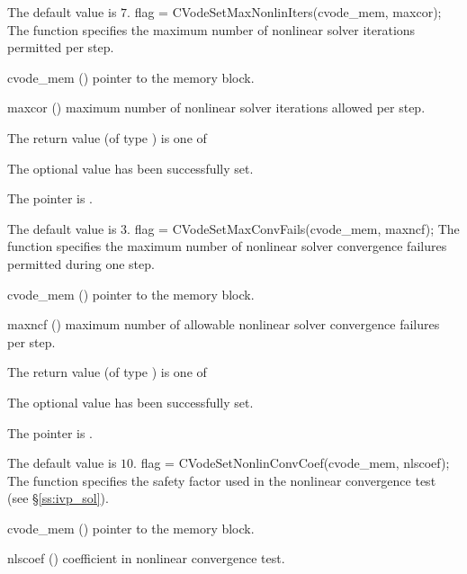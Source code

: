 {
  The default value is $7$.
}
{
flag = CVodeSetMaxNonlinIters(cvode\_mem, maxcor);
}
{
  The function  specifies the maximum
  number of nonlinear solver iterations permitted per step.
}
{
  \begin{args}
  \item[cvode\_mem] ()
    pointer to the {\cvodes} memory block.
  \item[maxcor] ()
    maximum number of nonlinear solver iterations allowed per step.
  \end{args}
}
{
  The return value  (of type ) is one of
  \begin{args}
  \item[\Id{CV\_SUCCESS}] 
    The optional value has been successfully set.
  \item[\Id{CV\_MEM\_NULL}]
    The  pointer is .
  \end{args}
}
{
  The default value is $3$.
}
{
flag = CVodeSetMaxConvFails(cvode\_mem, maxncf);
}
{
  The function  specifies the
  maximum number of nonlinear solver convergence failures permitted during
  one step.
}
{
  \begin{args}
  \item[cvode\_mem] ()
    pointer to the {\cvodes} memory block.
  \item[maxncf] ()
    maximum number of allowable nonlinear solver convergence failures
    per step.
  \end{args}
}
{
  The return value  (of type ) is one of
  \begin{args}
  \item[\Id{CV\_SUCCESS}] 
    The optional value has been successfully set.
  \item[\Id{CV\_MEM\_NULL}]
    The  pointer is .
  \end{args}
}
{
  The default value is $10$.
}
{
flag = CVodeSetNonlinConvCoef(cvode\_mem, nlscoef);
}
{
  The function  specifies the safety factor used
  in the nonlinear convergence test (see \S\ref{ss:ivp_sol}).
}
{
  \begin{args}
  \item[cvode\_mem] ()
    pointer to the {\cvodes} memory block.
  \item[nlscoef] ()
    coefficient in nonlinear convergence test.
  \end{args}
}
